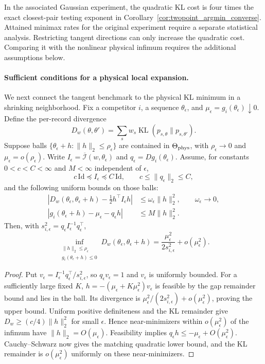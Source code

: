 \documentclass[a4paper,onecolumn,unpublished,nopdfoutputerror]{quantumarticle}
\theoremstyle{plain}
\theoremstyle{definition}
\newcommand{\1}{\mathbf{1}}
\newcommand{\KL}{\operatorname{KL}}
\begin{document}
In the associated Gaussian experiment, the quadratic KL cost is four times the exact closest-pair testing exponent in Corollary~\ref{cor:twopoint_argmin_converse}. Attained minimax rates for the original experiment require a separate statistical analysis. Restricting tangent directions can only increase the quadratic cost. Comparing it with the nonlinear physical infimum requires the additional assumptions below.

\paragraph{Sufficient conditions for a physical local expansion.}
We next connect the tangent benchmark to the physical KL minimum in a shrinking neighborhood. Fix a competitor $i$, a sequence $\theta_\epsilon$, and $\mu_\epsilon=g_i(\theta_\epsilon)\downarrow0$. Define the per-record divergence
\[
D_w(\theta,\theta')=\sum_s w_s\KL(p_{s,\theta}\|p_{s,\theta'}).
\]
Suppose balls $\{\theta_\epsilon+h:\|h\|_2\le\rho_\epsilon\}$ are contained in $\Theta_{\rm phys}$, with $\rho_\epsilon\to0$ and $\mu_\epsilon=o(\rho_\epsilon)$. Write $I_\epsilon=\overline{\mathcal I}(w,\theta_\epsilon)$ and $q_\epsilon=Dg_i(\theta_\epsilon)$. Assume, for constants $0<c<C<\infty$ and $M<\infty$ independent of $\epsilon$,
\[
c\,\mathrm{Id}\preceq I_\epsilon\preceq C\,\mathrm{Id},
\qquad c\le\|q_\epsilon\|_2\le C,
\]
and the following uniform bounds on those balls:
\begin{align*}
\left|D_w(\theta_\epsilon,\theta_\epsilon+h)-\tfrac12 h^\top I_\epsilon h\right|
&\le\omega_\epsilon\|h\|_2^2,\qquad \omega_\epsilon\to0,\\
\left|g_i(\theta_\epsilon+h)-\mu_\epsilon-q_\epsilon h\right|
&\le M\|h\|_2^2.
\end{align*}
Then, with $s_{i,\epsilon}^2=q_\epsilon I_\epsilon^{-1}q_\epsilon^\top$,
\begin{equation}\label{eq:fisher_physical_regular}
\inf_{\substack{\|h\|_2\le\rho_\epsilon\\g_i(\theta_\epsilon+h)\le0}}
D_w(\theta_\epsilon,\theta_\epsilon+h)
=\frac{\mu_\epsilon^2}{2s_{i,\epsilon}^2}+o(\mu_\epsilon^2).
\end{equation}

\begin{proof}
Put $v_\epsilon=I_\epsilon^{-1}q_\epsilon^\top/s_{i,\epsilon}^2$, so $q_\epsilon v_\epsilon=1$ and $v_\epsilon$ is uniformly bounded. For a sufficiently large fixed $K$, $h=-(\mu_\epsilon+K\mu_\epsilon^2)v_\epsilon$ is feasible by the gap remainder bound and lies in the ball. Its divergence is $\mu_\epsilon^2/(2s_{i,\epsilon}^2)+o(\mu_\epsilon^2)$, proving the upper bound. Uniform positive definiteness and the KL remainder give $D_w\ge(c/4)\|h\|_2^2$ for small $\epsilon$. Hence near-minimizers within $o(\mu_\epsilon^2)$ of the infimum have $\|h\|_2=O(\mu_\epsilon)$. Feasibility implies $q_\epsilon h\le-\mu_\epsilon+O(\mu_\epsilon^2)$. Cauchy--Schwarz now gives the matching quadratic lower bound, and the KL remainder is $o(\mu_\epsilon^2)$ uniformly on these near-minimizers.
\end{proof}
\end{document}
